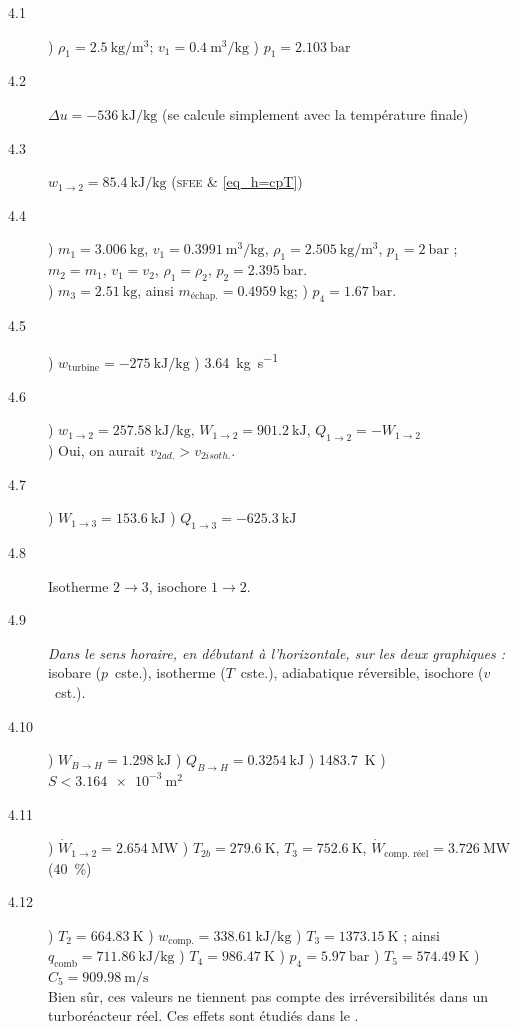 	\begin{description}
		\item [4.1] ) $\rho_1 = \SI{2,5}{\kilogram\per\metre\cubed}$; $v_1 = \SI{0,4}{\metre\cubed\per\kilogram}$ 
						) $p_1 = \SI{2,103}{\bar}$
		\item [4.2] \tab $\Delta u = \SI{-536}{\kilo\joule\per\kilogram}$ (se calcule simplement avec la température finale)
		\item [4.3] \tab $w_{1\to 2} = \SI{+85,4}{\kilo\joule\per\kilogram}$ (\textsc{sfee} \& \ref{eq_h=cpT})
		\item [4.4] ) $m_1 = \SI{3,006}{\kilogram}$, $v_1 = \SI{0,3991}{\metre\cubed\per\kilogram}$, $\rho_1 = \SI{2,505}{\kilogram\per\metre\cubed}$, $p_1 = \SI{2}{\bar}$ ;
						\tab $m_2 = m_1$, $v_1 = v_2$, $\rho_1 = \rho_2$, $p_2 = \SI{2,395}{\bar}$.\\
						) $m_{3} = \SI{2,51}{\kilogram}$, ainsi $m_\text{échap.} = \SI{0,4959}{\kilogram}$; 
						) $p_4 = \SI{1,67}{\bar}$.
		\item [4.5] ) $w_\text{turbine} = \SI{-275}{\kilo\joule\per\kilogram}$ 	
						) \SI{3,64}{\kilogram\per\second}
		\item [4.6] ) $w_{1 \to 2} = \SI{+257,58}{\kilo\joule\per\kilogram}$, $W_{1 \to 2} = \SI{+901,2}{\kilo\joule}$, $Q_{1 \to 2} = - W_{1 \to 2}$\\
					 	) Oui, on aurait $v_{2 ad.} > v_{2 isoth.}$. 
		\item [4.7] ) $W_{1 \to 3} = \SI{+153,6}{\kilo\joule}$	
						) $Q_{1 \to 3} = \SI{-625,3}{\kilo\joule}$
		\item [4.8] \tab Isotherme $2 \to 3$, isochore $1 \to 2$.
		\item [4.9] \tab \textit{Dans le sens horaire, en débutant à l’horizontale, sur les deux graphiques :} isobare ($p$~cste.), isotherme ($T$~cste.), adiabatique réversible, isochore ($v$~cst.).
		\item [4.10] 	) $W_{B \to H} = \SI{+1,298}{\kilo\joule}$ 	
							) $Q_{B \to H} = \SI{+0,3254}{\kilo\joule}$ 	
							) \SI{1483,7}{\kelvin} 
							) $S < \SI{3,164e-3}{\metre\squared}$
		\item [4.11] 	) $\dot{W}_{1 \to 2} = \SI{+2,654}{\mega\watt}$ 	
							) $T_{2b} = \SI{279,6}{\kelvin}$, $T_3 = \SI{752,6}{\kelvin}$, $\dot{W}_\text{comp. réel} = \SI{+3,726}{\mega\watt}$ (\SI{+40}{\percent})
		\item [4.12]	) $T_2 = \SI{664,83}{\kelvin}$
							) $w_\text{comp.} = \SI{+338,61}{\kilo\joule\per\kilogram}$
							) $T_3 = \SI{1373,15}{\kelvin}$ ; ainsi $q_\text{comb} = \SI{+711,86}{\kilo\joule\per\kilogram}$
							) $T_4 = \SI{986,47}{\kelvin}$
							) $p_4 = \SI{5,97}{\bar}$
							) $T_5 = \SI{574,49}{\kelvin}$
							) $C_5 = \SI{909,98}{\metre\per\second}$\\
							\tab Bien sûr, ces valeurs ne tiennent pas compte des irréversibilités dans un turboréacteur réel. Ces effets sont étudiés dans le \coursdix.
	\end{description}
